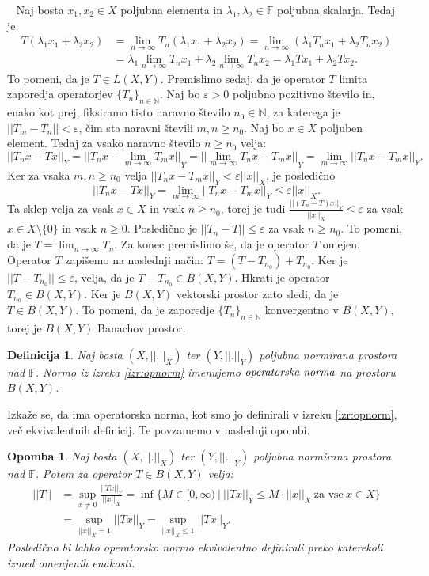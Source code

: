 \documentclass[12pt,a4paper,oneside,fleqn,openany]{book}
\newtheorem{definicija}[izrek]{Definicija}
\newtheorem{opomba}[izrek]{Opomba}
\newcommand{\eopf}{\raisebox{0.8ex}{\framebox{}}} %
\newenvironment{dokaz}%
{\noindent{\bf Dokaz.}\ }%
{\hfill\eopf\par\bigskip}%
\newcommand{\F}{\mathbb{F}}
\newcommand{\N}{\mathbb{N}}
\newcommand{\abs}[1]{\ensuremath{\lvert #1 \rvert}}
\newcommand{\norm}[1]{\abs{\abs{#1}}}
\newcommand{\pojem}[1]{\ensuremath{\emph{#1}}}
\begin{document}
\begin{dokaz}
	Naj bosta $x_1, x_2\in X$ poljubna elementa in $\lambda_1, \lambda_2\in \F$ poljubna skalarja. Tedaj je \begin{align*}
		T(\lambda_1x_1 + \lambda_2x_2)&=\lim_{n\to \infty}T_n(\lambda_1x_1 + \lambda_2x_2)=\lim_{n\to \infty}(\lambda_1T_nx_1 + \lambda_2T_nx_2) \\ 
		&= \lambda_1\lim_{n\to \infty}T_nx_1 + \lambda_2\lim_{n\to \infty}T_nx_2=\lambda_1Tx_1 + \lambda_2Tx_2.
	\end{align*} To pomeni, da je $T\in L(X, Y)$. Premislimo sedaj, da je operator $T$ limita zaporedja operatorjev $\{T_n\}_{n\in\N}$. 
	Naj bo $\varepsilon>0$ poljubno pozitivno število in, enako kot prej, fiksiramo tisto naravno število $n_0\in\N$, za katerega je $\norm{T_m - T_n} < \varepsilon$, čim sta naravni števili $m, n\geq n_0$. Naj bo $x\in X$ poljuben element. Tedaj za vsako naravno število $n\geq n_0$ velja: $$\norm{T_nx - Tx}_Y=\norm{T_nx - \lim_{m\to \infty}T_mx}_Y = \norm{\lim_{m\to \infty}T_nx-T_mx}_Y = \lim_{m\to \infty}\norm{T_nx-T_mx}_Y.$$ Ker za vsaka $m, n\geq n_0$ velja $\norm{T_nx - T_mx}_Y<\varepsilon\norm{x}_X$, je posledično $$\norm{T_nx - Tx}_Y = \lim_{m\to \infty}\norm{T_nx-T_mx}_Y\leq \varepsilon\norm{x}_X.$$ Ta sklep velja za vsak $x\in X$ in vsak $n\geq n_0$, torej je tudi $\frac{\norm{(T_n - T)x}_Y}{\norm{x}_X} \leq \varepsilon$ za vsak $x\in X\setminus\{0\}$ in vsak $n\geq 0$. Posledično je $\norm{T_n - T} \leq \varepsilon$ za vsak $n\geq n_0$. To pomeni, da je $T=\lim_{n\to \infty}T_n$.
	Za konec premislimo še, da je operator $T$ omejen. Operator $T$ zapišemo na naslednji način: $T = (T-T_{n_0}) + T_{n_0}$. Ker je $\norm{T-T_{n_0}}\leq \varepsilon$, velja, da je $T-T_{n_0}\in B(X, Y)$. Hkrati je operator $T_{n_0}\in B(X, Y)$. Ker je $B(X, Y)$ vektorski prostor zato sledi, da je $T\in B(X, Y)$. To pomeni, da je zaporedje $\{T_n\}_{n\in\N}$ konvergentno v $B(X, Y)$, torej je $B(X, Y)$ Banachov prostor.
\end{dokaz}
\begin{definicija}
 	\label{def:opnorm} Naj bosta $(X, \norm{.}_X)$ ter $(Y, \norm{.}_Y)$ poljubna normirana prostora nad $\F$. Normo iz izreka \ref{izr:opnorm} imenujemo \pojem{operatorska norma} na prostoru $B(X, Y)$.
\end{definicija}
Izkaže se, da ima operatorska norma, kot smo jo definirali v izreku \ref{izr:opnorm}, več ekvivalentnih definicij. Te povzamemo v naslednji opombi.
\begin{opomba}
	\label{opomb:opnorm}
	Naj bosta $(X, \norm{.}_X)$ ter $(Y, \norm{.}_Y)$ poljubna normirana prostora nad $\F$. Potem za operator $T\in B(X, Y)$ velja: \begin{align*}
		\norm{T}&=\sup_{x\neq 0}\frac{\norm{Tx}_Y}{\norm{x}_X}=\inf\{M\in [0, \infty)~|~\norm{Tx}_Y \leq M\cdot\norm{x}_X~\text{za vse}~x\in X\} \\ &=\sup_{\norm{x}_X =1}\norm{Tx}_Y = \sup_{\norm{x}_X\leq 1}\norm{Tx}_Y.
	\end{align*} Posledično bi lahko operatorsko normo ekvivalentno definirali preko katerekoli izmed omenjenih enakosti.
\end{opomba}
\end{document}
